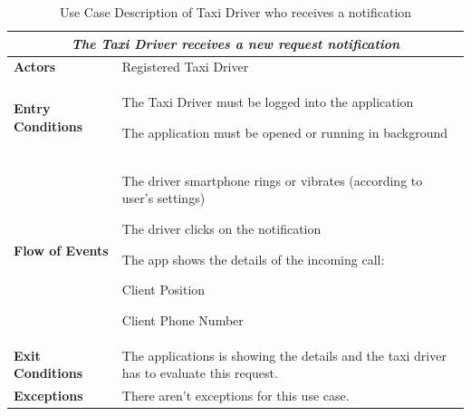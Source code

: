 \documentclass[a4paper]{article}
\begin{document}
\begin{enumerate}[label=\bfseries G\arabic*:]
\begin{table} [H]
\begin{center}
\begin{tabular}{ |m{}|m{}|  }
\hline
    \multicolumn{2}{|c|}{\textbf{\textit{The Taxi Driver receives a new request notification}}} \\
\hline \hline
    \textbf{Actors}
&   Registered Taxi Driver
\\ \hline
    \textbf{Entry Conditions}
&   
    \begin{itemize*}
    \item The Taxi Driver must be logged into the application
    \item The application must be opened or running in background
    \end{itemize*}
\\ \hline
    \textbf{Flow of Events}
& 
    \begin{enumerate*}
    \item The driver smartphone rings or vibrates (according to user's settings)
    \item The driver clicks on the notification
    \item The app shows the details of the incoming call:
        \begin{itemize*}
        \item Client Position
        \item Client Phone Number
        \end{itemize*}
    \end{enumerate*}
\\ \hline
    \textbf{Exit Conditions}
&  The applications is showing the details and the taxi driver has to evaluate this request.
\\ \hline
    \textbf{Exceptions}
&   There aren't exceptions for this use case.
\\ \hline
\end{tabular}
\end{center}
\caption{Use Case Description of Taxi Driver who receives a notification}
\label{table:taxireceivenotification}
\end{table}


\end{enumerate}
\end{document}
